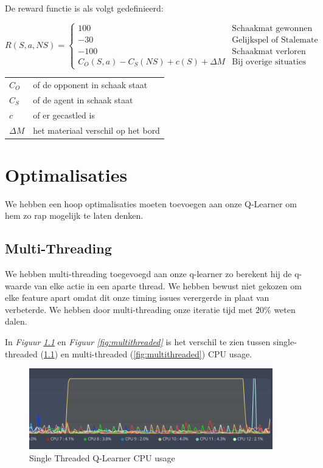 \documentclass[a4paper,openany]{uantwerpenassignment}
\makeatletter
\newenvironment{conditions}
  {\par\vspace{\abovedisplayskip}\noindent\begin{tabular}{>{$}l<{$} @{${}={}$} l}}
  {\end{tabular}\par\vspace{\belowdisplayskip}}
\newcommand{\figref}[1]{\textit{Figuur \ref{#1}}}
\makeatother
\begin{document}
De reward functie is als volgt gedefinieerd:


$$
R(S, a, NS) = 
\begin{cases}
    100 &\mbox{Schaakmat gewonnen}\\
    -30 &\mbox{Gelijkspel of Stalemate}\\
    -100 &\mbox{Schaakmat verloren}\\
     C_O(S, a) - C_S(NS) + c(S) + \Delta M &\mbox{Bij overige situaties}
\end{cases}
$$

\begin{conditions}
    C_O & of de opponent in schaak staat\\
    C_S & of de agent in schaak staat\\
    c &   of er gecastled is\\
    \Delta M & het materiaal verschil op het bord
\end{conditions}


\chapter{Optimalisaties}

We hebben een hoop optimalisaties moeten toevoegen aan onze Q-Learner om hem zo rap mogelijk te laten denken.

\section{Multi-Threading}

We hebben multi-threading toegevoegd aan onze q-learner zo berekent hij de q-waarde van elke actie in een aparte thread. We hebben bewust niet gekozen om elke feature apart omdat dit onze timing issues verergerde in plaat van verbeterde. We hebben door multi-threading onze iteratie tijd met $20\%$ weten dalen.

In \figref{fig:singlethreaded} en \figref{fig:multithreaded} is het verschil te zien tussen single-threaded \tiny(\ref{fig:singlethreaded})\small{ }en multi-threaded \tiny(\ref{fig:multithreaded})\small{ }CPU usage.

\begin{figure}[h]
    \centering
    \includegraphics[width=300pt]{images/singlethreaded.png}
    \caption{Single Threaded Q-Learner CPU usage}
    \label{fig:singlethreaded}
\end{figure}
\end{document}
